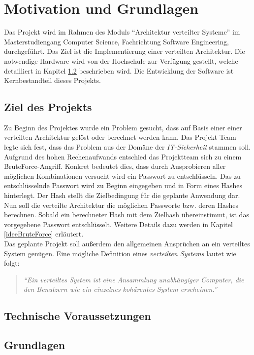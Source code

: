 \chapter{Motivation und Grundlagen}
Das Projekt wird im Rahmen des Moduls \enquote{Architektur verteilter Systeme} im Masterstudiengang Computer Science, Fachrichtung Software Engineering, durchgeführt.  Das Ziel ist die Implementierung einer verteilten Architektur. Die notwendige Hardware wird von der Hochschule zur Verfügung gestellt, welche detailliert in Kapitel \ref{technischeVoraussetzungen} beschrieben wird.
Die Entwicklung der Software ist Kernbestandteil dieses Projekts. 
\section{Ziel des Projekts}
Zu Beginn des Projektes wurde ein Problem gesucht, dass auf Basis einer einer verteilten Architektur gelöst oder berechnet werden kann. Das Projekt-Team legte sich fest, dass das Problem aus der Domäne der \emph{IT-Sicherheit} stammen soll. Aufgrund des hohen Rechenaufwands entschied das Projektteam sich zu einem BruteForce-Angriff. Konkret bedeutet dies, dass durch Ausprobieren aller möglichen Kombinationen versucht wird ein Passwort zu entschlüsseln. Das zu entschlüsselnde Passwort wird zu Beginn eingegeben und in Form eines Hashes hinterlegt. Der Hash stellt die Zielbedingung für die geplante Anwendung dar. Nun soll die verteilte Architektur die möglichen Passworte bzw. deren Hashes berechnen. Sobald ein berechneter Hash mit dem Zielhash übereinstimmt, ist das vorgegebene Passwort entschlüsselt. Weitere Details dazu werden in Kapitel \ref{ideeBruteForce} erläutert. \\

Das geplante Projekt soll außerdem den allgemeinen Ansprüchen an ein verteiltes System genügen. Eine mögliche Definition eines \emph{verteilten Systems} lautet wie folgt:
\begin{quotation}
	\textit{\enquote{Ein verteiltes System ist eine Ansammlung unabhängiger Computer, die den Benutzern wie ein einzelnes kohärentes System erscheinen.}} \citep{tanenbaum}
\end{quotation}

\section{Technische Voraussetzungen}
\label{technischeVoraussetzungen}

\section{Grundlagen}
\label{grundlagen}




